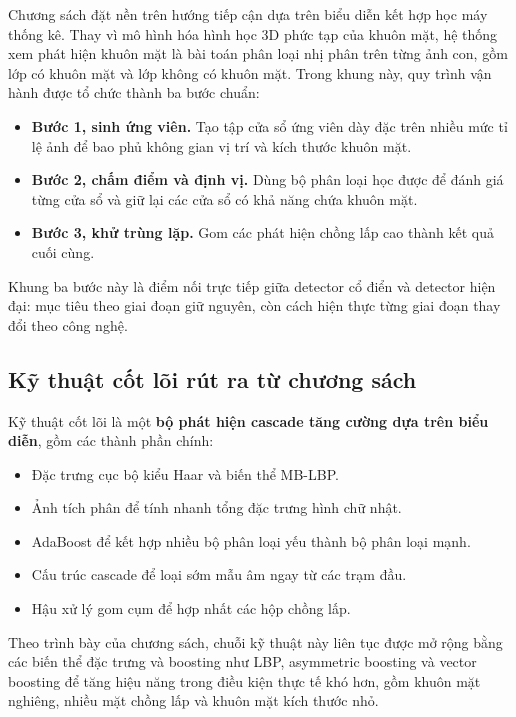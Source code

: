 Chương sách đặt nền trên hướng tiếp cận dựa trên biểu diễn kết hợp học máy thống kê.
Thay vì mô hình hóa hình học 3D phức tạp của khuôn mặt, hệ thống xem phát hiện khuôn mặt là bài toán phân loại nhị phân trên từng ảnh con, gồm lớp có khuôn mặt và lớp không có khuôn mặt.
Trong khung này, quy trình vận hành được tổ chức thành ba bước chuẩn:
\begin{itemize}
  \item \textbf{Bước 1, sinh ứng viên.} Tạo tập cửa sổ ứng viên dày đặc trên nhiều mức tỉ lệ ảnh để bao phủ không gian vị trí và kích thước khuôn mặt.
  \item \textbf{Bước 2, chấm điểm và định vị.} Dùng bộ phân loại học được để đánh giá từng cửa sổ và giữ lại các cửa sổ có khả năng chứa khuôn mặt.
  \item \textbf{Bước 3, khử trùng lặp.} Gom các phát hiện chồng lấp cao thành kết quả cuối cùng.
\end{itemize}

Khung ba bước này là điểm nối trực tiếp giữa detector cổ điển và detector hiện đại:
mục tiêu theo giai đoạn giữ nguyên, còn cách hiện thực từng giai đoạn thay đổi theo công nghệ.

\subsection{Kỹ thuật cốt lõi rút ra từ chương sách}

Kỹ thuật cốt lõi là một \textbf{bộ phát hiện cascade tăng cường dựa trên biểu diễn}, gồm các thành phần chính:
\begin{itemize}
  \item Đặc trưng cục bộ kiểu Haar và biến thể MB-LBP.
  \item Ảnh tích phân để tính nhanh tổng đặc trưng hình chữ nhật.
  \item AdaBoost để kết hợp nhiều bộ phân loại yếu thành bộ phân loại mạnh.
  \item Cấu trúc cascade để loại sớm mẫu âm ngay từ các trạm đầu.
  \item Hậu xử lý gom cụm để hợp nhất các hộp chồng lấp.
\end{itemize}
Theo trình bày của chương sách, chuỗi kỹ thuật này liên tục được mở rộng bằng các biến thể đặc trưng và boosting như LBP, asymmetric boosting và vector boosting để tăng hiệu năng trong điều kiện thực tế khó hơn, gồm khuôn mặt nghiêng, nhiều mặt chồng lấp và khuôn mặt kích thước nhỏ.  \cite{li2012facechapter}

